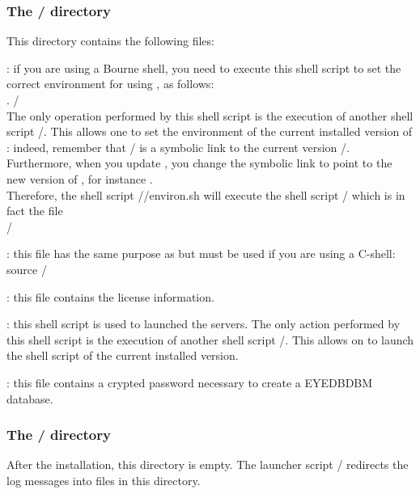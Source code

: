 \subsubsection{The \tdir/ directory}
This directory contains the following files:
\bi
\item {}: if you are using a Bourne shell, you need to execute
this shell script to set the correct environment for using \eyedb, as follows:
\\
. \tdir/
\\
The only operation performed by this shell script is the execution of
another shell script \tdir/.
This allows one to set the environment of the current
installed version of \eyedbX: indeed,
remember that \tdir/ is a symbolic link to the current version
\tdir/. Furthermore, when you update \eyedbX, you change the
 symbolic link to point to the new version of \eyedbX, for instance
.\\
Therefore, the shell script \tdir//environ.sh will execute
the shell script \tdir/ which is in fact the file\\
\tdir/
\item {}: this file has the same purpose as 
but must be used if you are using a C-shell:
\\
source \tdir/
\item {}: this file contains the license information.
\item {}: this shell script is used to launched the \eyedb servers.
The only action performed by this shell script is the execution
of another shell script \tdir/.
This allows on to launch the  shell script of the
current installed version. 
\item {}: this file contains a crypted password necessary
to create a \textsc{EYEDBDBM} database.
\ei
\subsubsection{The \tdir/ directory}
After the installation, this directory is empty. The launcher script
\tdir/ redirects the log messages into files
in this directory.
